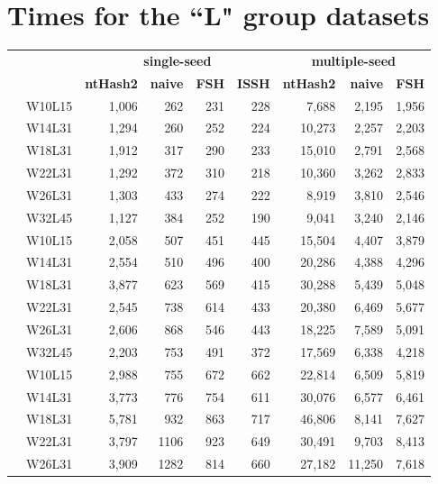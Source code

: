 \section{Times for the “L" group datasets}
\begin{table}[!ht]
	\raggedleft
	\begin{tabular}{c r | rrrr | rrr}
		& & \multicolumn{4}{|c}{\textbf{single-seed}} & \multicolumn{3}{|c}{\textbf{multiple-seed}} \\
		& & \textbf{ntHash2} & \textbf{naive} & \textbf{FSH} & \textbf{ISSH} & \textbf{ntHash2} &  \textbf{naive} & \textbf{FSH} \\
		\toprule
		\multirow{6}{*}{\rotatebox[origin=c]{90}{\textbf{L500000}}}
		& W10L15 & 1,006 & 262 & 231 & 228 & 7,688 & 2,195 & 1,956 \\
		& W14L31 & 1,294 & 260 & 252 & 224 & 10,273 & 2,257 & 2,203 \\
		& W18L31 & 1,912 & 317 & 290 & 233 & 15,010 & 2,791 & 2,568 \\
		& W22L31 & 1,292 & 372 & 310 & 218 & 10,360 & 3,262 & 2,833 \\
		& W26L31 & 1,303 & 433 & 274 & 222 & 8,919 & 3,810 & 2,546 \\
		& W32L45 & 1,127 & 384 & 252 & 190 & 9,041 & 3,240 & 2,146 \\
		\midrule
		\multirow{6}{*}{\rotatebox[origin=c]{90}{\textbf{L1000000}}}
		& W10L15 & 2,058 & 507 & 451 & 445 & 15,504 & 4,407 & 3,879 \\
		& W14L31 & 2,554 & 510 & 496 & 400 & 20,286 & 4,388 & 4,296 \\
		& W18L31 & 3,877 & 623 & 569 & 415 & 30,288 & 5,439 & 5,048 \\
		& W22L31 & 2,545 & 738 & 614 & 433 & 20,380 & 6,469 & 5,677 \\
		& W26L31 & 2,606 & 868 & 546 & 443 & 18,225 & 7,589 & 5,091 \\
		& W32L45 & 2,203 & 753 & 491 & 372 & 17,569 & 6,338 & 4,218 \\
		\midrule
		\multirow{6}{*}{\rotatebox[origin=c]{90}{\textbf{L1500000}}}
		& W10L15 & 2,988 & 755 & 672 & 662 & 22,814 & 6,509 & 5,819 \\
		& W14L31 & 3,773 & 776 & 754 & 611 & 30,076 & 6,577 & 6,461 \\
		& W18L31 & 5,781 & 932 & 863 & 717 & 46,806 & 8,141 & 7,627 \\
		& W22L31 & 3,797 & 1106 & 923 & 649 & 30,491 & 9,703 & 8,413 \\
		& W26L31 & 3,909 & 1282 & 814 & 660 & 27,182 & 11,250 & 7,618 \\

\end{tabular}
\end{table}
